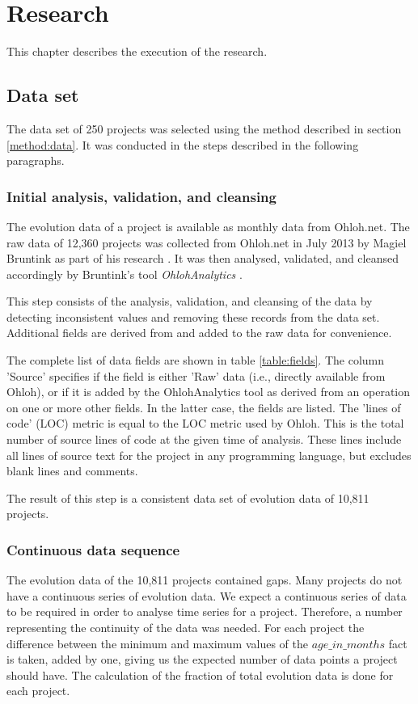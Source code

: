 \chapter{Research}
\label{research}

This chapter describes the execution of the research.

\section{Data set}
The data set of 250 projects was selected using the method described in section
\ref{method:data}. It was conducted in the steps described in the following
paragraphs.

\subsection{Initial analysis, validation, and cleansing}
The evolution data of a project is available as monthly data from Ohloh.net. The
raw data of 12,360 projects was collected from Ohloh.net in July 2013 by Magiel
Bruntink as part of his research \cite{bruntink2014}. It was then analysed,
validated, and cleansed accordingly by Bruntink's tool \emph{OhlohAnalytics}\rm
\cite{ohlohanalytics}.

This step consists of the analysis, validation, and cleansing of the data by
detecting inconsistent values and removing these records from the data set.
Additional fields are derived from and added to the raw data for convenience.

The complete list of data fields are shown in table \ref{table:fields}. The
column 'Source' specifies if the field is either 'Raw' data (i.e., directly
available from Ohloh), or if it is added by the OhlohAnalytics tool as derived
from an operation on one or more other fields. In the latter case, the fields
are listed. The 'lines of code' (LOC) metric is equal to the LOC metric used by
Ohloh. This is the total number of source lines of code at the given time of
analysis. These lines include all lines of source text for the project in any
programming language, but excludes blank lines and comments.

The result of this step is a consistent data set of evolution data of 10,811
projects.



\subsection{Continuous data sequence}
The evolution data of the 10,811 projects contained gaps. Many projects do not
have a continuous series of evolution data. We expect a continuous series of
data to be required in order to analyse time series for a project. Therefore, a
number representing the continuity of the data was needed. For each project the
difference between the minimum and maximum values of the $age\_in\_months$ fact
is taken, added by one, giving us the expected number of data points a project
should have. The calculation of the fraction of total evolution data is done
for each project.

